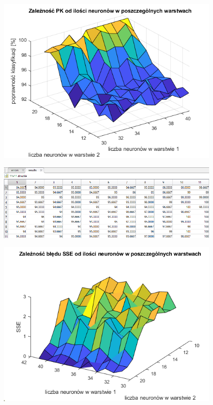 \documentclass[a4paper, 12pt]{report}
\begin{document}
\begin{figure}[hbt!]
\includegraphics[width=14cm]{s1s2 pk}
\centering
\end{figure}
\begin{figure}[hbt!]

\includegraphics[width=14cm]{s1s2 pk dane}
\centering
\end{figure}

\begin{figure}[hbt!]
\includegraphics[width=14cm]{s1s2 sse}
\centering
\end{figure}
\end{document}

